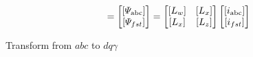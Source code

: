 \documentclass[a4paper,numbers=noenddot,12pt]{scrbook}
\begin{document}
    \begin{equation}
        [\varPsi{\textup{abc}fst}] = 
        \begin{bmatrix}
            [\varPsi_{\textup{abc}}] \\
            [\varPsi_{fst}]
        \end{bmatrix}
        =
        \begin{bmatrix}
            [L_w] & [L_x] \\
            [L_x] & [L_z]
        \end{bmatrix}
        \begin{bmatrix}
            [i_{\textup{abc}}] \\
            [i_{fst}]
        \end{bmatrix}
        \label{eq:Eq8.23}
    \end{equation}

    Transform from $abc$ to $dq\gamma$
    
\end{document}
